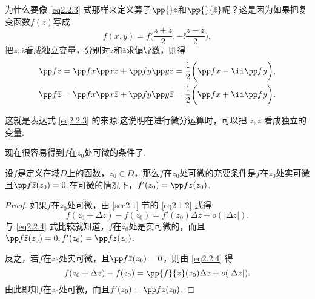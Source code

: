 为什么要像 \eqref{eq2.2.3} 式那样来定义算子$\pp{}z$和$\pp{}{\bar z}$呢？这是因为如果把复变函数$f(z)$写成
\[
  f(x,y) = f\bigg(\frac{z + \bar z}2, -\ii\frac{z - \bar z}2\bigg),
\]
把$z,\bar z$看成独立变量，分别对$z$和$\bar z$求偏导数，则得
\begin{gather*}
  \pp fz = \pp fx\pp xz + \pp fy\pp yz = \frac12\bigg(\pp fx - \ii\pp fy\bigg),\\
  \pp f{\bar z} = \pp fx\pp x{\bar z} + \pp fy\pp y{\bar z} = \frac12\bigg(\pp fx + \ii\pp fy\bigg).
\end{gather*}

这就是表达式 \eqref{eq2.2.3} 的来源.这说明在进行微分运算时，可以把 $z,\bar z$ 看成独立的变量.

现在很容易得到$f$在$z_0$处可微的条件了.
\begin{theorem}\label{thm2.2.3}
  设$f$是定义在域$D$上的函数，$z_0\in D$，那么$f$在$z_0$处可微的充要条件是$f$在$z_0$处实可微且$\pp f{\bar z}(z_0)=0$.在可微的情况下，$f'(z_0)=\pp fz(z_0)$.
\end{theorem}
\begin{proof}
  如果$f$在$z_0$处可微，由 \ref{sec2.1} 节的 \eqref{eq2.1.2} 式得
  \[
    f(z_0 + \Delta z) - f(z_0) = f'(z_0)\Delta z + o(|\Delta z|).
  \]
  与 \eqref{eq2.2.4} 式比较就知道，$f$在$z_0$处是实可微的，而且$\pp f{\bar z}(z_0)=0,f'(z_0)=\pp fz(z_0)$.

  反之，若$f$在$z_0$处实可微，且$\pp f{\bar z}(z_0)=0$，则由 \eqref{eq2.2.4} 得
  \[
    f(z_0 + \Delta z) - f(z_0) = \pp{f}{z}(z_0)\Delta z + o(|\Delta z|).
  \]
  由此即知$f$在$z_0$处可微，而且$f'(z_0)=\pp fz(z_0)$.
\end{proof}

